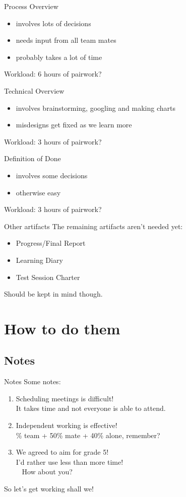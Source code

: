 \documentclass{beamer}
\begin{document}
\begin{frame}{Process Overview}
  \begin{itemize}
  \item involves lots of decisions
  \item needs input from all team mates
  \item probably takes a lot of time
  \end{itemize}
  Workload: 6 hours of pairwork?
\end{frame}
\begin{frame}{Technical Overview}
  \begin{itemize}
  \item involves brainstorming, googling and making charts
  \item misdesigns get fixed as we learn more
  \end{itemize}
  Workload: 3 hours of pairwork?
\end{frame}
\begin{frame}{Definition of Done}
  \begin{itemize}
  \item involves some decisions
  \item otherwise easy
  \end{itemize}
  Workload: 3 hours of pairwork?
\end{frame}
\begin{frame}{Other artifacts}
  The remaining artifacts aren't needed yet:
  \begin{itemize}
  \item Progress/Final Report
  \item Learning Diary
  \item Test Session Charter
  \end{itemize}
  Should be kept in mind though.
\end{frame}
\section{How to do them}
\subsection{Notes}
\begin{frame}{Notes}
  Some notes:
  \begin{enumerate}
  \pause \item Scheduling meetings is difficult! \\
  \pause It takes time and not everyone is able to attend.
  \pause \item Independent working is effective! \\
  \% team + 50\% mate + 40\% alone, remember?
  \pause \item We agreed to aim for grade 5! \\
  \pause I'd rather use \alert{less} than more time! \\
  ~ How about you?
  \end{enumerate}
  \pause So let's get working shall we!
\end{frame}
\end{document}
